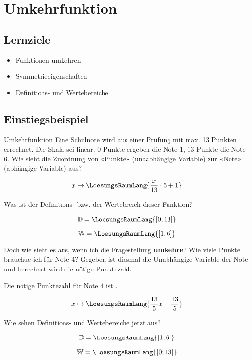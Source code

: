 \section{Umkehrfunktion}

\subsection{Lernziele}

\begin{itemize}
\item Funktionen umkehren
\item Symmetrieeigenschaften
\item Definitions- und Wertebereiche
\end{itemize} 
\newpage

\subsection{Einstiegsbeispiel}
\begin{beispiel}{Umkehrfunktion}{}
  Eine Schulnote wird aus einer Prüfung mit max. 13 Punkten errechnet.
  Die Skala sei linear. 0 Punkte ergeben die Note 1, 13 Punkte die
  Note 6. Wie sieht die Zuordnung von «Punkte» (unaabhängige Variable)
  zur «Note» (abhängige Variable) aus?

  \leserluft
  
  $$x \mapsto  \LoesungsRaumLang{\frac{x}{13}\cdot{} 5 + 1}$$

  Was ist der Definitions- bzw. der Wertebreich dieser Funktion?

  \leserluft
  
  $$\mathbb{D} = \LoesungsRaumLang{[0; 13]}$$

  \leserluft
  
  $$\mathbb{W} = \LoesungsRaumLang{[1; 6]}$$

  Doch wie sieht es aus, wenn ich die Fragestellung \textbf{umkehre}?
  Wie viele Punkte brauchue ich für Note 4? Gegeben ist diesmal die
  Unabhängige Variable der Note und berechnet wird die nötige
  Punktezahl.

  \leserluft{}
  
  Die nötige Punktezahl für Note 4 ist .

  \leserluft{}
  
  $$x \mapsto \LoesungsRaumLang{\frac{13}5 x - \frac{13}5}$$

    Wie sehen Definitions- und Wertebereiche jetzt aus?

    $$\mathbb{D} = \LoesungsRaumLang{ [1; 6] }$$


    $$\mathbb{W} = \LoesungsRaumLang{ [0;13] }$$
  
\end{beispiel}
\newpage

